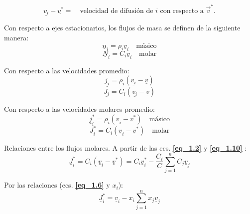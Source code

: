  \begin{equation}
 	\underline{{v}_i} -\underline{{v}^*}=\quad \text{velocidad de difusión de $i$ con respecto a $\vec{v}^*$}. \tag{1.4} \label{eq_1.4}
 \end{equation}
 
 Con respecto a ejes estacionarios, los flujos de masa se definen de la siguiente manera:
 \begin{equation}
 	\underline{n}_i = \rho_i \underline{v}_i \quad \text{másico} \tag{1.5}
    \label{eq_1.5}
 \end{equation}
 \begin{equation}
 	\underline{N}_i = C_i \underline{v}_i \quad \text{molar} \tag{1.6}\label{eq_1.6}
 \end{equation}
 
 Con respecto a las velocidades promedio:
 \begin{equation}
 		\underline{{j}_i} = \rho_i (	\underline{{v}_i} -\underline{v}) \tag{1.7}\label{eq_1.7}
 \end{equation}
 \begin{equation}
 	\underline{{J}_i} = C_i (\underline{{v}_i} -	\underline{v}) \tag{1.8} \label{eq_1.8}
 \end{equation}
 
 Con respecto a las velocidades molares promedio:
 \begin{equation}
 	\underline{j}_i^* = \rho_i (\underline{v}_i - \underline{v}^*) \quad \text{másico} \tag{1.9} \label{eq_1.9}
 \end{equation}
 \begin{equation}
 	\underline{J}_i^* = C_i (\underline{v}_i - \underline{v}^*) \quad \text{molar} \tag{1.10} \label{eq_1.10}
 \end{equation}
 
 Relaciones entre los flujos molares. A partir de las ecs. \textbf{\eqref{eq_1.2}} y \textbf{\eqref{eq_1.10}} :
 \begin{equation}
 	\underline{J}_i^* = C_i (\underline{v}_i - \underline{v}^*) = C_i \underline{v}_i^* - \frac{C_i}{C} \sum_{j=1}^n C_j \underline{v}_j \tag{1.11} \label{eq_1.11}
 \end{equation}
 
 Por las relaciones (ecs. \textbf{\eqref{eq_1.6}} y $x_i$):
 \begin{equation}
 	\underline{J}_i^* = \underline{v}_i - x_i \sum_{j=1}^n x_j \underline{v}_j \tag{1.12}\label{eq_1.12}
 \end{equation}
 
